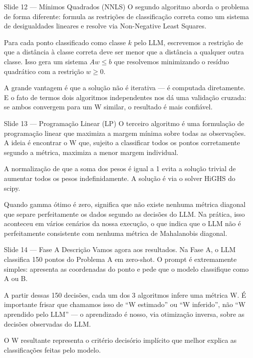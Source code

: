 \documentclass[aspectratio=169,11pt]{beamer}
\begin{document}
\begin{frame}{Slide 12 --- Mínimos Quadrados (NNLS)}
\small
O segundo algoritmo aborda o problema de forma diferente: formula as restrições de classificação correta como um sistema de desigualdades lineares e resolve via Non-Negative Least Squares.

Para cada ponto classificado como classe $k$ pelo LLM, escrevemos a restrição de que a distância à classe correta deve ser menor que a distância a qualquer outra classe. Isso gera um sistema $Aw \leq b$ que resolvemos minimizando o resíduo quadrático com a restrição $w \geq 0$.

A grande vantagem é que a solução não é iterativa --- é computada diretamente. E o fato de termos dois algoritmos independentes nos dá uma validação cruzada: se ambos convergem para um W similar, o resultado é mais confiável.
\end{frame}

\begin{frame}{Slide 13 --- Programação Linear (LP)}
\small
O terceiro algoritmo é uma formulação de programação linear que maximiza a margem mínima sobre todas as observações. A ideia é encontrar o W que, sujeito a classificar todos os pontos corretamente segundo a métrica, maximiza a menor margem individual.

A normalização de que a soma dos pesos é igual a 1 evita a solução trivial de aumentar todos os pesos indefinidamente. A solução é via o solver HiGHS do scipy.

Quando gamma ótimo é zero, significa que não existe nenhuma métrica diagonal que separe perfeitamente os dados segundo as decisões do LLM. Na prática, isso aconteceu em vários cenários da nossa execução, o que indica que o LLM não é perfeitamente consistente com nenhuma métrica de Mahalanobis diagonal.
\end{frame}

\begin{frame}{Slide 14 --- Fase A Descrição}
\small
Vamos agora aos resultados. Na Fase A, o LLM classifica 150 pontos do Problema A em zero-shot. O prompt é extremamente simples: apresenta as coordenadas do ponto e pede que o modelo classifique como A ou B.

A partir dessas 150 decisões, cada um dos 3 algoritmos infere uma métrica W. É importante frisar que chamamos isso de ``W estimado'' ou ``W inferido'', não ``W aprendido pelo LLM'' --- o aprendizado é nosso, via otimização inversa, sobre as decisões observadas do LLM.

O W resultante representa o critério decisório implícito que melhor explica as classificações feitas pelo modelo.
\end{frame}
\end{document}
